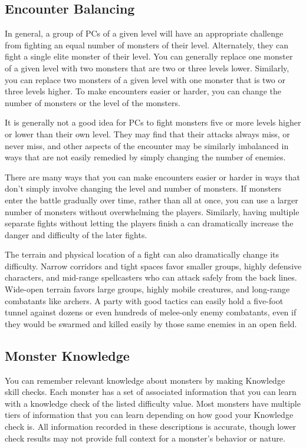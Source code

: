     \subsection{Encounter Balancing}\label{Encounter Balancing}
        In general, a group of PCs of a given level will have an appropriate challenge from fighting an equal number of monsters of their level.
        Alternately, they can fight a single elite monster of their level.
        You can generally replace one monster of a given level with two monsters that are two or three levels lower.
        Similarly, you can replace two monsters of a given level with one monster that is two or three levels higher.
        To make encounters easier or harder, you can change the number of monsters or the level of the monsters.

        It is generally not a good idea for PCs to fight monsters five or more levels higher or lower than their own level.
        They may find that their attacks always miss, or never miss, and other aspects of the encounter may be similarly imbalanced in ways that are not easily remedied by simply changing the number of enemies.

        There are many ways that you can make encounters easier or harder in ways that don't simply involve changing the level and number of monsters.
        If monsters enter the battle gradually over time, rather than all at once, you can use a larger number of monsters without overwhelming the players.
        Similarly, having multiple separate fights without letting the players finish a  can dramatically increase the danger and difficulty of the later fights.

        The terrain and physical location of a fight can also dramatically change its difficulty.
        Narrow corridors and tight spaces favor smaller groups, highly defensive characters, and mid-range spellcasters who can attack safely from the back lines.
        Wide-open terrain favors large groups, highly mobile creatures, and long-range combatants like archers.
        A party with good tactics can easily hold a five-foot tunnel against dozens or even hundreds of melee-only enemy combatants, even if they would be swarmed and killed easily by those same enemies in an open field.

    \subsection{Monster Knowledge}
        You can remember relevant knowledge about monsters by making Knowledge skill checks.
        Each monster has a set of associated information that you can learn with a knowledge check of the listed difficulty value.
        Most monsters have multiple tiers of information that you can learn depending on how good your Knowledge check is.
        All information recorded in these descriptions is accurate, though lower check results may not provide full context for a monster's behavior or nature.

